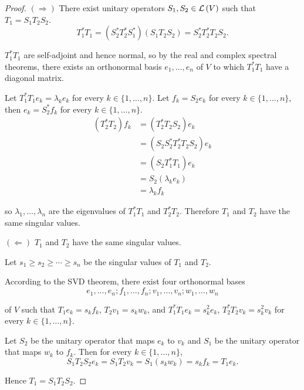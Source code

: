 \begin{proof}
    $(\Rightarrow)$ There exist unitary operators $S_{1}, S_{2} \in \mathcal{L}\left({V}\right)$ such that $T_{1} = S_{1}T_{2}S_{2}$.
    \[
        T_{1}^{*}T_{1} = (S_{2}^{*}T_{2}^{*}S_{1}^{*})(S_{1}T_{2}S_{2}) = S_{2}^{*}T_{2}^{*}T_{2}S_{2}.
    \]

    $T_{1}^{*}T_{1}$ are self-adjoint and hence normal, so by the real and complex spectral theorems, there exists an orthonormal basis $e_{1}, \ldots, e_{n}$ of $V$ to which $T_{1}^{*}T_{1}$ have a diagonal matrix.

    Let $T_{1}^{*}T_{1}e_{k} = \lambda_{k}e_{k}$ for every $k\in\{1,\ldots,n\}$. Let $f_{k} = S_{2}e_{k}$ for every $k\in\{1,\ldots,n\}$, then $e_{k} = S_{2}^{*}f_{k}$ for every $k\in\{1,\ldots,n\}$.
    \begin{align*}
        (T_{2}^{*}T_{2})f_{k} & = (T_{2}^{*}T_{2}S_{2})e_{k}               \\
                              & = (S_{2}S_{2}^{*}T_{2}^{*}T_{2}S_{2})e_{k} \\
                              & = (S_{2}T_{1}^{*}T_{1})e_{k}               \\
                              & = S_{2}(\lambda_{k}e_{k})                  \\
                              & = \lambda_{k}f_{k}
    \end{align*}

    so $\lambda_{1}, \ldots, \lambda_{n}$ are the eigenvalues of $T_{1}^{*}T_{1}$ and $T_{2}^{*}T_{2}$. Therefore $T_{1}$ and $T_{2}$ have the same singular values.

    \bigskip
    $(\Leftarrow)$ $T_{1}$ and $T_{2}$ have the same singular values.

    Let $s_{1}\geq s_{2}\geq \cdots \geq s_{n}$ be the singular values of $T_{1}$ and $T_{2}$.

    According to the SVD theorem, there exist four orthonormal bases
    \[
        e_{1}, \ldots, e_{n}; f_{1}, \ldots, f_{n}; v_{1}, \ldots, v_{n}; w_{1}, \ldots, w_{n}
    \]

    of $V$ such that $T_{1}e_{k} = s_{k}f_{k}$, $T_{2}v_{1} = s_{k}w_{k}$, and $T_{1}^{*}T_{1}e_{k} = s_{k}^{2}e_{k}$, $T_{2}^{*}T_{2}v_{k} = s_{k}^{2}v_{k}$ for every $k\in\{1,\ldots, n\}$.

    Let $S_{2}$ be the unitary operator that maps $e_{k}$ to $v_{k}$ and $S_{1}$ be the unitary operator that maps $w_{k}$ to $f_{k}$. Then for every $k\in\{1,\ldots,n\}$,
    \[
        S_{1}T_{2}S_{2}e_{k} = S_{1}T_{2}v_{k} = S_{1}(s_{k}w_{k}) = s_{k}f_{k} = T_{1}e_{k}.
    \]

    Hence $T_{1} = S_{1}T_{2}S_{2}$.
\end{proof}
\newpage

